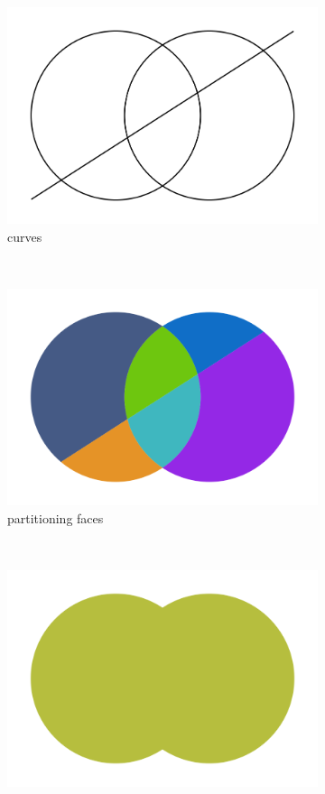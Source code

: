 \begin{figure}%
  \centering
  \begin{subfigure}{.32\textwidth}
    \includegraphics[width=\textwidth]{figures/intro_curves2.png}
    \caption{curves} \label{subfig:subd_superface_a}
  \end{subfigure}%
  ~%
  \begin{subfigure}{.32\textwidth}
    \includegraphics[width=\textwidth]{figures/intro_partitioning2.png}
    \caption{partitioning faces} \label{subfig:subd_superface_b}
  \end{subfigure}%
  ~%
  \begin{subfigure}{.32\textwidth}
    \includegraphics[width=\textwidth]{figures/subd_superface.png}

\end{subfigure}
\end{figure}
